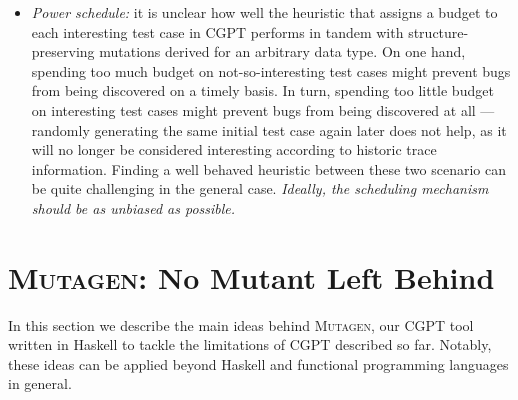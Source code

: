 \documentclass[sigconf,review,anonymous]{acmart}
\newcommand{\mutagen}{\textsc{Mutagen}\xspace}
\begin{document}
\begin{itemize}
\item \emph{Power schedule:}
%
it is unclear how well the heuristic that assigns a budget to each interesting
test case in CGPT performs in tandem with structure-preserving mutations derived
for an arbitrary data type.
%
On one hand, spending too much budget on not-so-interesting test cases might
prevent bugs from being discovered on a timely basis.
%
In turn, spending too little budget on interesting test cases might prevent bugs
from being discovered at all --- randomly generating the same initial test case
again later does not help, as it will no longer be considered interesting
according to historic trace information.
%
Finding a well behaved heuristic between these two scenario can be quite
challenging in the general case. 
%
\emph{Ideally, the scheduling mechanism should be as unbiased as possible.}

%

\end{itemize}




\section{\mutagen: No Mutant Left Behind}
\label{sec:mutagen}

In this section we describe the main ideas behind \mutagen, our CGPT tool
written in Haskell to tackle the limitations of CGPT described so far.
%
Notably, these ideas can be applied beyond Haskell and functional programming
languages in general.
%
\end{document}
